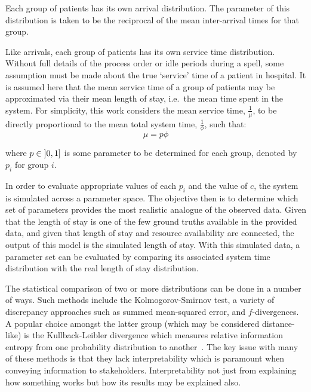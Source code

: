 Each group of patients has its own arrival distribution. The parameter of this
distribution is taken to be the reciprocal of the mean inter-arrival times for
that group.

Like arrivals, each group of patients has its own service time distribution.
Without full details of the process order or idle periods during a spell, some
assumption must be made about the true `service' time of a patient in hospital.
It is assumed here that the mean service time of a group of patients may be
approximated via their mean length of stay, i.e.\ the mean time spent in the
system. For simplicity, this work considers the mean service time,
\(\frac{1}{\mu}\), to be directly proportional to the mean total system time,
\(\frac{1}{\phi}\), such that:
\begin{equation}
    \mu = p \phi
\end{equation}

\noindent where \(p \in \interval[open left]{0}{1}\) is some parameter to be
determined for each group, denoted by \(p_i\) for group \(i\).

In order to evaluate appropriate values of each \(p_i\) and the value of \(c\),
the system is simulated across a parameter space. The objective then is to
determine which set of parameters provides the most realistic analogue of the
observed data. Given that the length of stay is one of the few ground truths
available in the provided data, and given that length of stay and resource
availability are connected, the output of this model is the simulated length of
stay. With this simulated data, a parameter set can be evaluated by comparing
its associated system time distribution with the real length of stay
distribution.

The statistical comparison of two or more distributions can be done in a number
of ways. Such methods include the Kolmogorov-Smirnov test, a variety of
discrepancy approaches such as summed mean-squared error, and \(f\)-divergences.
A popular choice amongst the latter group (which may be considered
distance-like) is the Kullback-Leibler divergence which measures relative
information entropy from one probability distribution to
another~\cite{Kullback1951}. The key issue with many of these methods is that
they lack interpretability which is paramount when conveying information to
stakeholders. Interpretability not just from explaining how something works but
how its results may be explained also.

